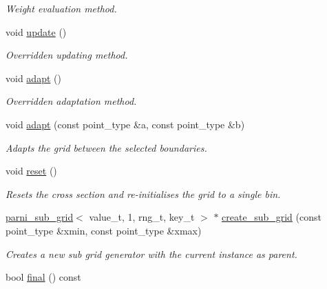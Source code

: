 \begin{DoxyCompactItemize}
\begin{DoxyCompactList}\small\item\em Weight evaluation method. \end{DoxyCompactList}\item 
\hypertarget{a00394_a770b5d662eb26778e947b8520595dfc1}{}void \hyperlink{a00394_a770b5d662eb26778e947b8520595dfc1}{update} ()\label{a00394_a770b5d662eb26778e947b8520595dfc1}

\begin{DoxyCompactList}\small\item\em Overridden updating method. \end{DoxyCompactList}\item 
\hypertarget{a00394_acf415f24c29ac223a824deed030d2e21}{}void \hyperlink{a00394_acf415f24c29ac223a824deed030d2e21}{adapt} ()\label{a00394_acf415f24c29ac223a824deed030d2e21}

\begin{DoxyCompactList}\small\item\em Overridden adaptation method. \end{DoxyCompactList}\item 
\hypertarget{a00394_aa84dbbd05ef7515ae8256f545902338d}{}void \hyperlink{a00394_aa84dbbd05ef7515ae8256f545902338d}{adapt} (const point\+\_\+type \&a, const point\+\_\+type \&b)\label{a00394_aa84dbbd05ef7515ae8256f545902338d}

\begin{DoxyCompactList}\small\item\em Adapts the grid between the selected boundaries. \end{DoxyCompactList}\item 
void \hyperlink{a00394_acb562943c0312deaf243646362585fb8}{reset} ()
\begin{DoxyCompactList}\small\item\em Resets the cross section and re-\/initialises the grid to a single bin. \end{DoxyCompactList}\item 
\hypertarget{a00394_afdee32f35369a06bd9935e6896c9450e}{}\hyperlink{a00397}{parni\+\_\+sub\+\_\+grid}$<$ value\+\_\+t, 1, rng\+\_\+t, key\+\_\+t $>$ $\ast$ \hyperlink{a00394_afdee32f35369a06bd9935e6896c9450e}{create\+\_\+sub\+\_\+grid} (const point\+\_\+type \&xmin, const point\+\_\+type \&xmax)\label{a00394_afdee32f35369a06bd9935e6896c9450e}

\begin{DoxyCompactList}\small\item\em Creates a new sub grid generator with the current instance as parent. \end{DoxyCompactList}\item 
\hypertarget{a00394_ac83517a027bc610f89f7864a332df918}{}bool \hyperlink{a00394_ac83517a027bc610f89f7864a332df918}{final} () const \label{a00394_ac83517a027bc610f89f7864a332df918}


\end{DoxyCompactItemize}
